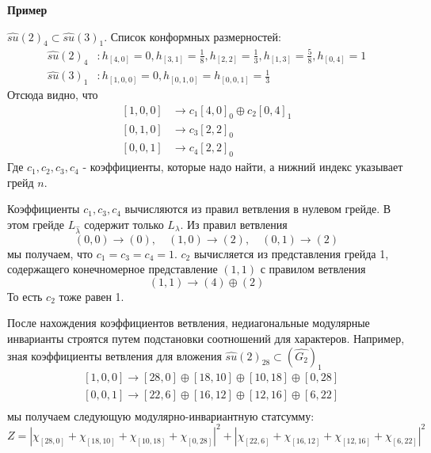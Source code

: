 \documentclass[a4paper,12pt]{article}
\theoremstyle{definition} \newtheorem{Def}{Definition}
\begin{document}
{\bf Пример}

$\hat{su}(2)_4\subset \hat{su}(3)_1$.
Список конформных размерностей:
\begin{equation}
  \label{eq:16}
  \begin{aligned}
    \hat{su}(2)_4&: h_{[4,0]}=0, h_{[3,1]}=\frac{1}{8}, h_{[2,2]}=\frac{1}{3}, h_{[1,3]}=\frac{5}{8}, h_{[0,4]}=1\\
    \hat{su}(3)_1&: h_{[1,0,0]}=0, h_{[0,1,0]}=h_{[0,0,1]}=\frac{1}{3}    
  \end{aligned}
\end{equation}
Отсюда видно, что
\begin{equation}
  \label{eq:17}
  \begin{aligned}
    \left[1,0,0\right] &\to c_1 [4,0]_0\oplus c_2 [0,4]_1\\
    [0,1,0] &\to c_3 [2,2]_0\\
    [0,0,1] &\to c_4 [2,2]_0
  \end{aligned}
\end{equation}
Где $c_1, c_2, c_3, c_4$ - коэффициенты, которые надо найти, а нижний индекс указывает грейд $n$.

Коэффициенты $c_1, c_3, c_4$ вычисляются из правил ветвления в нулевом грейде. В этом грейде $L_{\hat\lambda}$ содержит только $L_{\lambda}$. Из правил ветвления
\begin{equation}
  \label{eq:18}
  (0,0)\to (0),\quad (1,0)\to (2),\quad (0,1)\to (2)
\end{equation}
мы получаем, что $c_1=c_3=c_4=1$. $c_2$ вычисляется из представления грейда 1, содержащего конечномерное представление $(1,1)$ с правилом ветвления
\begin{equation}
  \label{eq:19}
  (1,1)\to (4)\oplus (2)
\end{equation}
То есть $c_2$ тоже равен 1.

После нахождения коэффициентов ветвления, недиагональные модулярные инварианты строятся путем подстановки соотношений для характеров. Например, зная коэффициенты ветвления для вложения $\hat{su}(2)_{28}\subset (\hat{G_2})_1$
  \begin{equation}
    \label{eq:20}
    \begin{aligned}
      & [1,0,0]\to [28,0]\oplus [18,10]\oplus [10,18]\oplus [0,28]\\
      & [0,0,1]\to [22,6]\oplus [16,12]\oplus [12,16]\oplus [6,22]\\
    \end{aligned}
  \end{equation}
мы получаем следующую модулярно-инвариантную статсумму:
\begin{equation}
  \label{eq:21}
  Z=\left|\chi_{[28,0]}+\chi_{[18,10]}+\chi_{[10,18]}+\chi_{[0,28]}\right|^2+\left|\chi_{[22,6]}+\chi_{[16,12]}+\chi_{[12,16]}+\chi_{[6,22]}\right|^2
\end{equation}

{}

\end{document}
